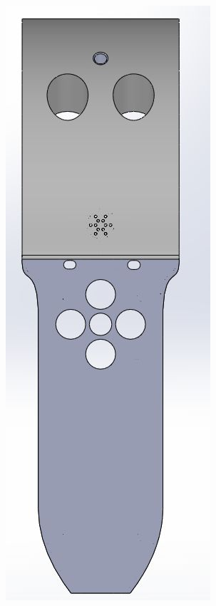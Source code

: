 \begin{figure}[!htbp]
\begin{subfigure}[m]{.3\linewidth}
    \end{subfigure}
    \hfill
    \begin{subfigure}[m]{.3\linewidth}
        \includegraphics[width=\linewidth]{assets/conception1/img334.jpg}

\end{subfigure}
\end{figure}
